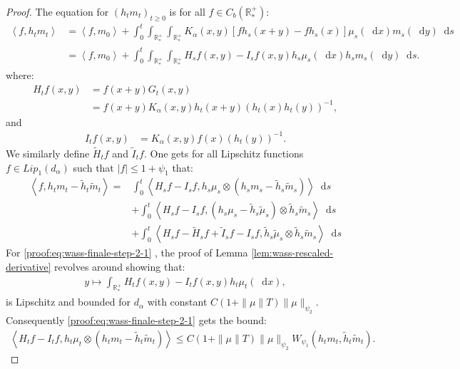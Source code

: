 \documentclass[11pt,a4paper]{article}
\newcommand{\RRP}{\mathbb{R}^+_*}
\newcommand{\Proc}[1]{\left(#1\right)_{t\geq 0}}
\newcommand{\brac}[1]{\left\langle#1\right\rangle}
\newcommand{\dd}{\mathop{}\!\mathrm{d}}
\begin{document}
\begin{proof}
    The equation for $\Proc{h_tm_t}$ is for all $f \in C_b(\RRP)$:
    \begin{align*}
        \brac{f,h_t m_t} 
        &= \brac{f,m_0} + \int_0^t \int_{\RRP} \int_{\RRP} K_\alpha(x,y) \left[fh_s(x+y) - fh_s(x)\right] \mu_s(\dd x) m_s(\dd y) \dd s \\
        &= \brac{f,m_0} + \int_0^t \int_{\RRP} \int_{\RRP} H_sf(x,y) - I_sf(x,y) h_s\mu_s(\dd x) h_sm_s(\dd y) \dd s.
    \end{align*}
    where:
    \begin{align*}
        H_tf(x,y) 
        &= f(x+y)G_t(x,y) \\
        &= f(x+y)K_\alpha(x,y)h_t(x+y)\left(h_t(x)h_t(y)\right)^{-1},
    \end{align*}
    and
    \begin{align*}
        I_tf(x,y) 
        &= K_\alpha(x,y)f(x)\left(h_t(y)\right)^{-1}.
    \end{align*}
    We similarly define $\tilde{H}_tf$ and $\tilde{I}_tf$. One gets for all Lipschitz functions $f \in Lip_1(d_{\alpha})$ such that $|f| \leq 1 + \psi_1$ that:
    \begin{subequations}
    \begin{align}
        \brac{f, h_tm_t - \tilde{h}_t\tilde{m}_t} =& \int_0^t \brac{H_sf- I_sf ,h_s\mu_s \otimes \left(h_sm_s - \tilde{h}_s\tilde{m}_s \right) } \dd s\label{proof:eq:wass-finale-step-2-1}\\ 
        &+ \int_0^t\brac{H_sf- I_sf,\left(h_s\mu_s - \tilde{h}_s\tilde{\mu}_s\right)\otimes \tilde{h}_s\tilde{m}_s} \dd s\label{proof:eq:wass-finale-step-2-2} \\ 
        &+ \int_0^t \brac{H_sf-\tilde{H}_sf + \tilde{I}_sf - I_sf,\tilde{h}_s\tilde{\mu}_s\otimes \tilde{h}_s\tilde{m}_s}\dd s\label{proof:eq:wass-finale-step-2-3} 
    \end{align}
    \label{proof:eq:wass-finale-step-2}
    \end{subequations}
    For \eqref{proof:eq:wass-finale-step-2-1} , the proof of Lemma \ref{lem:wass-rescaled-derivative} revolves around showing that:
    \begin{align*}
        y \mapsto \int_{\RRP} H_tf(x,y)- I_tf(x,y) h_t\mu_t(\dd x), 
    \end{align*}
    is Lipschitz and bounded for $d_\alpha$ with constant $C(1 + \|\mu\|T)\|\mu\|_{\psi_2}$. Consequently \eqref{proof:eq:wass-finale-step-2-1} gets the bound:
    \begin{align*}
        \brac{H_tf- I_tf ,h_t\mu_t \otimes \left(h_tm_t - \tilde{h}_t\tilde{m}_t \right) } \leq C(1 + \|\mu\|T)\|\mu\|_{\psi_2}W_{\psi_1}\left(h_tm_t , \tilde{h}_t\tilde{m}_t \right).

\end{align*}
\end{proof}
\end{document}
